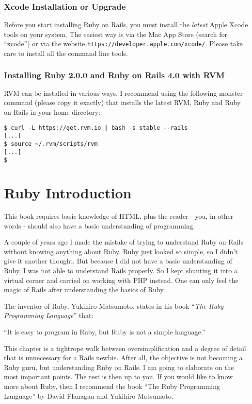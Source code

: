\documentclass[a4paper]{book}
\newcounter{tab}[chapter]
\newcommand{\chap}[1]{\newpage\thispagestyle{empty}\chapter{#1}\label{chap:\thechapter}}
\begin{document}
\subsection{Xcode Installation or Upgrade}\label{xcode-installation-or-upgrade}

Before you start installing Ruby on Rails, you must install the \emph{latest} Apple Xcode tools on your system. The easiest way is via the Mac App Store (search for “xcode”) or via the website \texttt{https://developer.apple.com/xcode/}. Please take care to install all the command line tools.

\subsection{Installing Ruby 2.0.0 and Ruby on Rails 4.0 with RVM}\label{installing-ruby-2.0.0-and-ruby-on-rails-4.0-with-rvm-1}

RVM can be installed in various ways. I recommend using the following monster command (please copy it exactly) that installs the latest RVM, Ruby and Ruby on Rails in your home directory:

\begin{shaded}\begin{verbatim}
$ curl -L https://get.rvm.io | bash -s stable --rails
[...]
$ source ~/.rvm/scripts/rvm
[...]
$
\end{verbatim}\end{shaded}

\chap{Ruby Introduction}\label{ruby-introduction}

This book requires basic knowledge of HTML, plus the reader - you, in other words - should also have a basic understanding of programming.

A couple of years ago I made the mistake of trying to understand Ruby on Rails without knowing anything about Ruby. Ruby just looked so simple, so I didn't give it another thought. But because I did not have a basic understanding of Ruby, I was not able to understand Rails properly. So I kept shunting it into a virtual corner and carried on working with PHP instead. One can only feel the magic of Rails after understanding the basics of Ruby.

The inventor of Ruby, Yukihiro Matsumoto, states in his book “\emph{The Ruby Programming Language}” that:

“It is easy to program in Ruby, but Ruby is not a simple language.”

This chapter is a tightrope walk between oversimplification and a degree of detail that is unnecessary for a Rails newbie. After all, the objective is not becoming a Ruby guru, but understanding Ruby on Rails. I am going to elaborate on the most important points. The rest is then up to you. If you would like to know more about Ruby, then I recommend the book “The Ruby Programming Language” by David Flanagan and Yukihiro Matsumoto.
\end{document}
